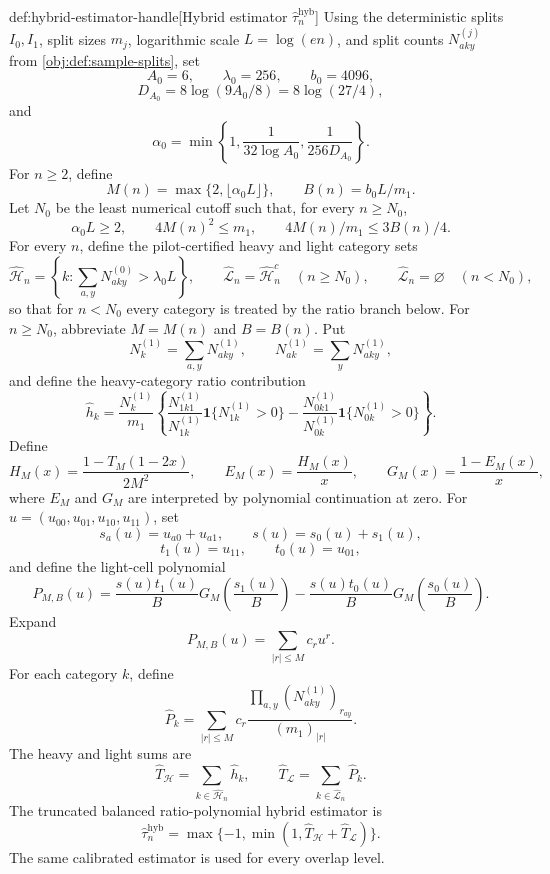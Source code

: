 \documentclass[11pt]{article}
\begin{document}
\begin{definitionv}{def:hybrid-estimator-handle}[Hybrid estimator \(\widehat\tau_n^{\mathrm{hyb}}\)]
Using the deterministic splits \(I_0,I_1\), split sizes \(m_j\), logarithmic scale \(L=\log(en)\), and split counts \(N^{(j)}_{aky}\) from \cref{obj:def:sample-splits}, set
\[
A_0=6,\qquad \lambda_0=256,\qquad b_0=4096,
\]
\[
D_{A_0}=8\log(9A_0/8)=8\log(27/4),
\]
and
\[
\alpha_0=\min\left\{1,\frac1{32\log A_0},\frac1{256D_{A_0}}\right\}.
\]
For \(n\ge2\), define
\[
M(n)=\max\{2,\lfloor\alpha_0L\rfloor\},\qquad B(n)=b_0L/m_1.
\]
Let \(N_0\) be the least numerical cutoff such that, for every \(n\ge N_0\),
\[
\alpha_0L\ge2,\qquad 4M(n)^2\le m_1,\qquad 4M(n)/m_1\le 3B(n)/4.
\]
For every \(n\), define the pilot-certified heavy and light category sets
\[
\widehat{\mathcal H}_n
=
\left\{k:\sum_{a,y}N^{(0)}_{aky}>\lambda_0L\right\},
\qquad
\widehat{\mathcal L}_n=\widehat{\mathcal H}_n^c\quad(n\ge N_0),
\qquad
\widehat{\mathcal L}_n=\varnothing\quad(n<N_0),
\]
so that for \(n<N_0\) every category is treated by the ratio branch below. For \(n\ge N_0\), abbreviate \(M=M(n)\) and \(B=B(n)\).
Put
\[
N_k^{(1)}=\sum_{a,y}N^{(1)}_{aky},
\qquad
N_{ak}^{(1)}=\sum_yN^{(1)}_{aky},
\]
and define the heavy-category ratio contribution
\[
\widehat h_k
=
\frac{N_k^{(1)}}{m_1}
\left\{
\frac{N^{(1)}_{1k1}}{N^{(1)}_{1k}}\mathbf1\{N^{(1)}_{1k}>0\}
-
\frac{N^{(1)}_{0k1}}{N^{(1)}_{0k}}\mathbf1\{N^{(1)}_{0k}>0\}
\right\}.
\]
Define
\[
H_M(x)=\frac{1-T_M(1-2x)}{2M^2},
\qquad
E_M(x)=\frac{H_M(x)}{x},
\qquad
G_M(x)=\frac{1-E_M(x)}{x},
\]
where \(E_M\) and \(G_M\) are interpreted by polynomial continuation at zero. For \(u=(u_{00},u_{01},u_{10},u_{11})\), set
\[
s_a(u)=u_{a0}+u_{a1},\qquad s(u)=s_0(u)+s_1(u),
\]
\[
t_1(u)=u_{11},\qquad t_0(u)=u_{01},
\]
and define the light-cell polynomial
\[
P_{M,B}(u)
=
\frac{s(u)t_1(u)}B
G_M\!\left(\frac{s_1(u)}B\right)
-
\frac{s(u)t_0(u)}B
G_M\!\left(\frac{s_0(u)}B\right).
\]
Expand
\[
P_{M,B}(u)=\sum_{|r|\le M}c_ru^r.
\]
For each category \(k\), define
\[
\widehat P_k
=
\sum_{|r|\le M}
c_r
\frac{\prod_{a,y}(N^{(1)}_{aky})_{r_{ay}}}{(m_1)_{|r|}}.
\]
The heavy and light sums are
\[
\widehat T_{\mathcal H}
=
\sum_{k\in\widehat{\mathcal H}_n}\widehat h_k,
\qquad
\widehat T_{\mathcal L}
=
\sum_{k\in\widehat{\mathcal L}_n}\widehat P_k.
\]
The truncated balanced ratio-polynomial hybrid estimator is
\[
\widehat\tau_n^{\mathrm{hyb}}
=
\max\{-1,\min(1,\widehat T_{\mathcal H}+\widehat T_{\mathcal L})\}.
\]
The same calibrated estimator is used for every overlap level.
\end{definitionv}
\end{document}
